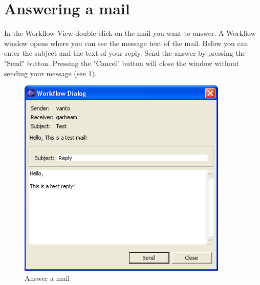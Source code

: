 \section{Answering a mail}

In the Workflow View double-click on the mail you want to answer. A Workflow
window opens where you can see the message text of the mail. Below you can enter
the subject and the text of your reply. Send the answer by pressing the "Send" 
button. Pressing the "Cancel" button will close the window without sending 
your message (see \ref{answermail}).

\begin{figure}[h!]
\begin{center}
\includegraphics[width=10cm]{answermail.png}
   \caption{Answer a mail}
\label{answermail}
\end{center}
\end{figure}\par







